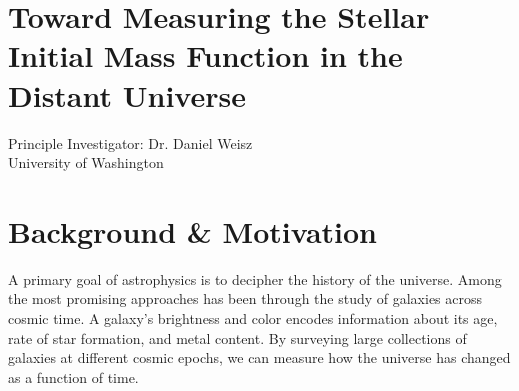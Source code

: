 \documentclass[11pt,preprint]{aastex}
\begin{document}
\section*{\Large Toward Measuring the Stellar Initial Mass Function in the Distant Universe}


\begin{center}
Principle Investigator: Dr. Daniel Weisz\\
University of Washington
\end{center}



\section{Background \& Motivation}
\label{sec:overview}

A primary goal of astrophysics is to decipher the history of the universe.  Among the most promising approaches has been through the study of galaxies across cosmic time. A galaxy's brightness and color encodes information about its age, rate of star formation, and metal content.  By surveying large collections of galaxies at different cosmic epochs, we can measure how the universe has changed as a function of time.  
\end{document}
